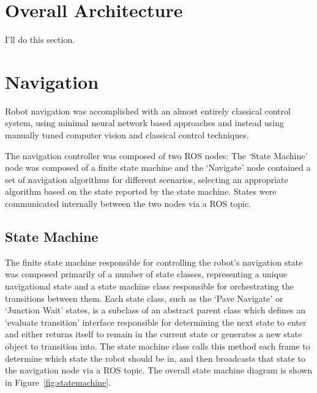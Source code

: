 \documentclass[titlepage, twocolumn]{article}
\begin{document}
\section{Overall Architecture}

    I'll do this section. 

\section{Navigation}
    Robot navigation was accomplished with an almost entirely classical control system, using minimal neural network based approaches and instead using manually tuned computer vision and classical control techniques. 

    The navigation controller was composed of two ROS nodes: The `State Machine' node was composed of a finite state machine and the `Navigate' node contained a set of navigation algorithms for different scenarios, selecting an appropriate algorithm based on the state reported by the state machine. States were communicated internally between the two nodes via a ROS topic.
    
    \subsection{State Machine}
        The finite state machine responsible for controlling the robot's navigation state was composed primarily of a number of state classes, representing a unique navigational state and a state machine class responsible for orchestrating the transitions between them. Each state class, such as the `Pave Navigate' or `Junction Wait' states, is a subclass of an abstract parent class which defines an `evaluate transition' interface responsible for determining the next state to enter and either returns itself to remain in the current state or generates a new state object to transition into. The state machine class calls this method each frame to determine which state the robot should be in, and then broadcasts that state to the navigation node via a ROS topic. The overall state machine diagram is shown in Figure~\ref{fig:statemachine}.
\end{document}
